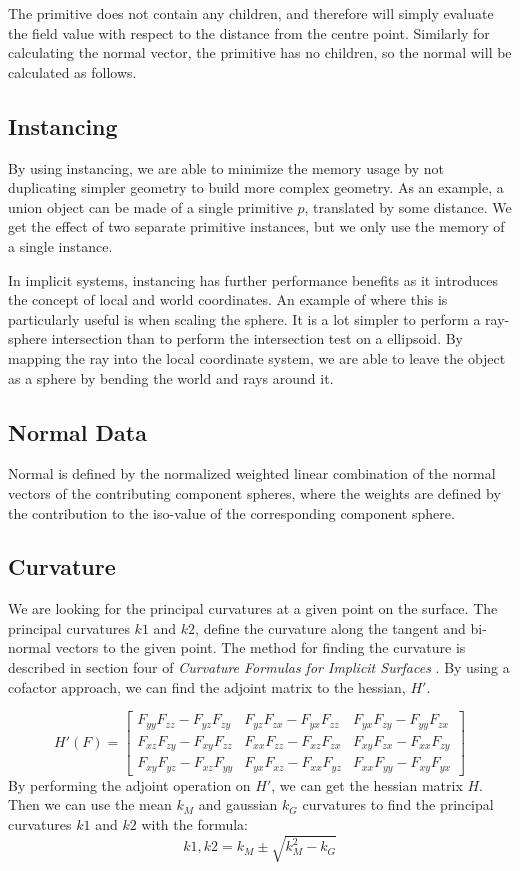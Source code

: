 \documentclass[conference]{acmsiggraph}
\begin{document}
The primitive does not contain any children, and therefore will simply
evaluate the field value with respect to the distance from the centre point.
Similarly for calculating the normal vector, the primitive has no children, so
the normal will be calculated as follows.

\subsection{Instancing}
By using instancing, we are able to minimize the memory usage by not
duplicating simpler geometry to build more complex geometry. As an example, a
union object can be made of a single primitive $p$, translated by some
distance. We get the effect of two separate primitive instances, but we only
use the memory of a single instance.

In implicit systems, instancing has further performance benefits as it
introduces the concept of local and world coordinates. An example of where this
is particularly useful is when scaling the sphere. It is a lot simpler to
perform a ray-sphere intersection than to perform the intersection test on a
ellipsoid. By mapping the ray into the local coordinate system, we are able to
leave the object as a sphere by bending the world and rays around it.
\subsection{Normal Data}
Normal is defined by the normalized weighted linear combination of the normal
vectors of the contributing component spheres, where the weights are defined by
the contribution to the iso-value of the corresponding component
sphere\cite{Wyvill}.
\subsection{Curvature}
We are looking for the principal curvatures at a given point on the surface.
The principal curvatures $k1$ and $k2$, define the curvature along the tangent
and bi-normal vectors to the given point. The method for finding the curvature
is described in section four of \textit{Curvature Formulas for Implicit
Surfaces} \cite{Goldman2005}. By using a cofactor approach, we can find the adjoint matrix to the
hessian, $H'$. 

$$
H'(F) =
\begin{bmatrix}
	F_{yy}F_{zz} - F_{yz}F_{zy} & F_{yz}F_{zx} - F_{yx}F_{zz} & F_{yx}F_{zy} - F_{yy}F_{zx} \\
	F_{xz}F_{zy} - F_{xy}F_{zz} & F_{xx}F_{zz} - F_{xz}F_{zx} & F_{xy}F_{zx} - F_{xx}F_{zy} \\
	F_{xy}F_{yz} - F_{xz}F_{yy} & F_{yx}F_{xz} - F_{xx}F_{yz} & F_{xx}F_{yy} - F_{xy}F_{yx}
\end{bmatrix}
$$
By performing the adjoint operation on $H'$, we can get the
hessian matrix $H$. Then we can use the mean $k_M$ and gaussian $k_G$
curvatures to find
the principal curvatures $k1$ and $k2$ with the formula:
$$k1, k2 = k_M \pm \sqrt{k^2_{M} - k_G}$$
\end{document}
